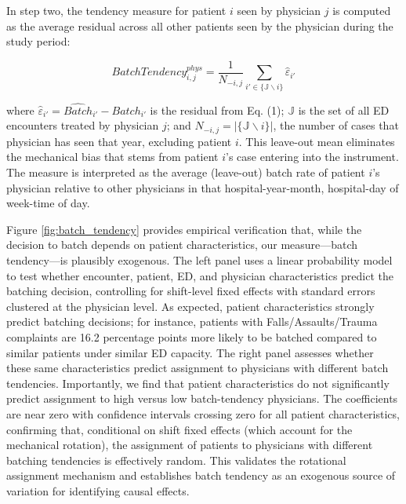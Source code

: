 \documentclass[,,nonblindrev]{informs}
\begin{document}
In step two, the tendency measure for patient \(i\) seen by physician
\(j\) is computed as the average residual across all other patients seen
by the physician during the study period:

\begin{equation}
Batch Tendency_{i,j}^{phys} =
\frac{1}{N_{-i,j}} \sum_{i' \in \{\mathbb{J} \backslash i\}}\hat{\varepsilon}_{i'}
\end{equation}

where \(\hat{\varepsilon}_{i'} = \hat{Batch}_{i'} - Batch_{i'}\) is the
residual from Eq. (1); \(\mathbb{J}\) is the set of all ED encounters
treated by physician \(j\); and
\(N_{-i,j} = |\{\mathbb{J} \backslash i\}|\), the number of cases that
physician has seen that year, excluding patient \(i\). This leave-out
mean eliminates the mechanical bias that stems from patient \(i\)'s case
entering into the instrument. The measure is interpreted as the average
(leave-out) batch rate of patient \(i\)'s physician relative to other
physicians in that hospital-year-month, hospital-day of week-time of
day.

Figure \ref{fig:batch_tendency} provides empirical verification that,
while the decision to batch depends on patient characteristics, our
measure---batch tendency---is plausibly exogenous. The left panel uses a
linear probability model to test whether encounter, patient, ED, and
physician characteristics predict the batching decision, controlling for
shift-level fixed effects with standard errors clustered at the
physician level. As expected, patient characteristics strongly predict
batching decisions; for instance, patients with Falls/Assaults/Trauma
complaints are 16.2 percentage points more likely to be batched compared
to similar patients under similar ED capacity. The right panel assesses
whether these same characteristics predict assignment to physicians with
different batch tendencies. Importantly, we find that patient
characteristics do not significantly predict assignment to high versus
low batch-tendency physicians. The coefficients are near zero with
confidence intervals crossing zero for all patient characteristics,
confirming that, conditional on shift fixed effects (which account for
the mechanical rotation), the assignment of patients to physicians with
different batching tendencies is effectively random. This validates the
rotational assignment mechanism and establishes batch tendency as an
exogenous source of variation for identifying causal effects.
\end{document}
